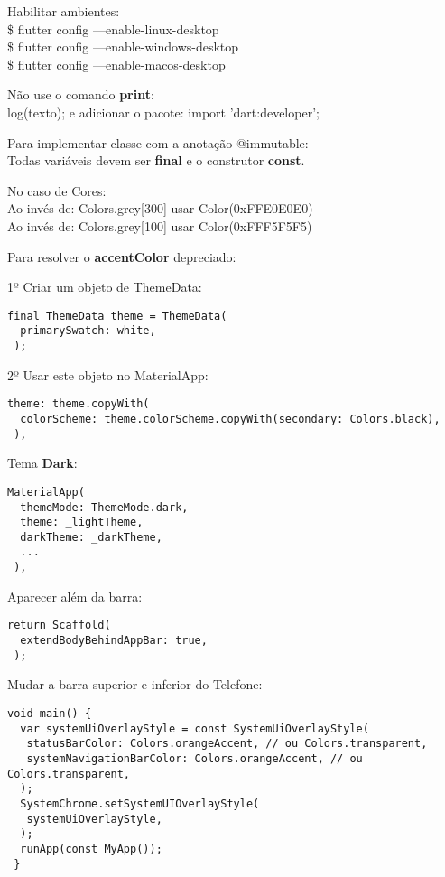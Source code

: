 \documentclass[11pt]{scrartcl}
\begin{document}
Habilitar ambientes: \\
{\ttfamily\$ flutter config ---enable-linux-desktop} \\
{\ttfamily\$ flutter config ---enable-windows-desktop} \\
{\ttfamily\$ flutter config ---enable-macos-desktop}

Não use o comando \textbf{print}: \\
{\ttfamily log(texto);} e adicionar o pacote: {\ttfamily import 'dart:developer';}

Para implementar classe com a anotação @immutable: \\
Todas variáveis devem ser \textbf{final} e o construtor \textbf{const}.

No caso de Cores: \\
Ao invés de: {\ttfamily Colors.grey[300]} usar {\ttfamily Color(0xFFE0E0E0)} \\
Ao invés de: {\ttfamily Colors.grey[100]} usar {\ttfamily Color(0xFFF5F5F5)}

Para resolver o \textbf{accentColor} depreciado:

1º Criar um objeto de ThemeData:
\begin{lstlisting}[]
 final ThemeData theme = ThemeData(
  primarySwatch: white,
 );
\end{lstlisting}

2º Usar este objeto no MaterialApp:
\begin{lstlisting}[]
 theme: theme.copyWith(
  colorScheme: theme.colorScheme.copyWith(secondary: Colors.black),
 ),
\end{lstlisting}

Tema \textbf{Dark}:
\begin{lstlisting}[]
 MaterialApp(
  themeMode: ThemeMode.dark,
  theme: _lightTheme,
  darkTheme: _darkTheme,
  ...
 ),	
\end{lstlisting}

Aparecer além da barra:
\begin{lstlisting}[]
 return Scaffold(
  extendBodyBehindAppBar: true,
 ); 
\end{lstlisting}

Mudar a barra superior e inferior do Telefone:
\begin{lstlisting}[]
 void main() {
  var systemUiOverlayStyle = const SystemUiOverlayStyle(
   statusBarColor: Colors.orangeAccent, // ou Colors.transparent,
   systemNavigationBarColor: Colors.orangeAccent, // ou Colors.transparent,
  );
  SystemChrome.setSystemUIOverlayStyle(
   systemUiOverlayStyle,
  );
  runApp(const MyApp());
 }
\end{lstlisting}
\end{document}
